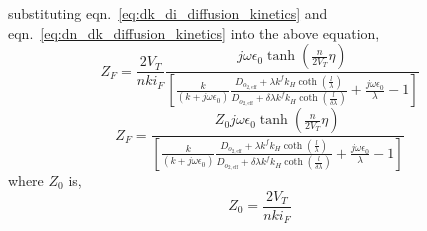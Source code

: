 \documentclass[Notes.tex]{subfiles}
\begin{document}
substituting eqn.~\ref{eq:dk_di_diffusion_kinetics} and eqn.~\ref{eq:dn_dk_diffusion_kinetics} into the above equation,
\begin{equation}
	Z_F = \frac{2V_T}{nki_F} \frac{j\omega\epsilon_0\tanh{\left(\frac{n}{2V_T}\eta\right)}} {\left[\frac{k}{\left(k+j\omega\epsilon_0\right)} \frac{D_{o_{2,\textrm{eff}}} + \lambda k^f k_H\coth{\left(\frac{l}{\lambda}\right)}}{D_{o_{2,\textrm{eff}}} + \delta\lambda k^f k_H \coth{\left(\frac{l}{\delta\lambda}\right)}} + \frac{j\omega\epsilon_0}{\lambda} - 1\right]}\nonumber
\end{equation}
\begin{equation}
Z_F = \frac{Z_0j\omega\epsilon_0\tanh{\left(\frac{n}{2V_T}\eta\right)}} {\left[\frac{k}{\left(k+j\omega\epsilon_0\right)} \frac{D_{o_{2,\textrm{eff}}} + \lambda k^f k_H\coth{\left(\frac{l}{\lambda}\right)}}{D_{o_{2,\textrm{eff}}} + \delta\lambda k^f k_H \coth{\left(\frac{l}{\delta\lambda}\right)}} + \frac{j\omega\epsilon_0}{\lambda} - 1\right]}
\end{equation} 
where $Z_0$ is,
\begin{equation}
Z_0 = \frac{2V_T}{nki_F} 
\end{equation}
\end{document}
